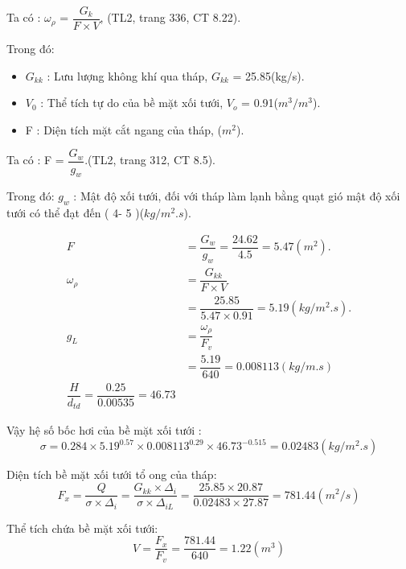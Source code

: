Ta có :  $\omega_{\rho}$ = $\dfrac{G_{k}}{F \times V}$, (TL2, trang 336, CT 8.22).

Trong đó:
\begin{itemize}
	\item $G_{kk}$ : Lưu lượng không khí qua tháp, $G_{kk}$ = 25.85(kg/s).
	\item $V_{0}$ : Thể tích tự do của bề mặt xối tưới, $V_{o}$ = 0.91($m^3/m^3$).
	\item F : Diện tích mặt cắt ngang của tháp, ($m^2$).
\end{itemize}

\newpage
Ta có : F = $\dfrac{G_{w}}{g_{w}}$.(TL2, trang 312, CT 8.5).

Trong đó:
$g_{w}$ : Mật độ xối tưới, đối với tháp làm lạnh bằng quạt gió mật độ xối tưới có thể đạt đến ( 4- 5 )($kg/m^2.s$).

\begin{equation*}
	\begin{split}
		F& = \dfrac{G_{w}}{g_{w}}= \dfrac{24.62}{4.5} = 5.47(m^2).\\
		\omega_{\rho}& = \dfrac{G_{kk}}{F \times V}\\ 
		             & = \dfrac{25.85}{5.47 \times 0.91} = 5.19(kg/m^2.s).\\
		g_{L}& = \dfrac{\omega_{\rho}}{F_{v}}\\
		     & = \dfrac{5.19}{640}=0.008113(kg/m.s) \\ 
		\dfrac{H}{d_{td}} = \dfrac{0.25}{0.00535}= 46.73             
	\end{split}
\end{equation*}

Vậy hệ số bốc hơi của bề mặt xối tưới :
\begin{equation*}
	\sigma = 0.284 \times 5.19^{0.57} \times 0.008113^{0.29} \times 46.73^{-0.515} = 0.02483 (kg/m^2.s)
\end{equation*}

Diện tích bề mặt xối tưới tổ ong của tháp:
\begin{equation*}
	F_{x} = \dfrac{Q}{\sigma \times \Delta_{i}} =\dfrac{G_{kk} \times \Delta_{i}}{\sigma \times \Delta_{iL}} = \dfrac{25.85 \times 20.87}{0.02483 \times 27.87} = 781.44(m^2/s)
\end{equation*}

Thể tích chứa bề mặt xối tưới:
\begin{equation*}
	V = \dfrac{F_{x}}{F_{v}} = \dfrac{781.44}{640} = 1.22(m^3)
\end{equation*}

